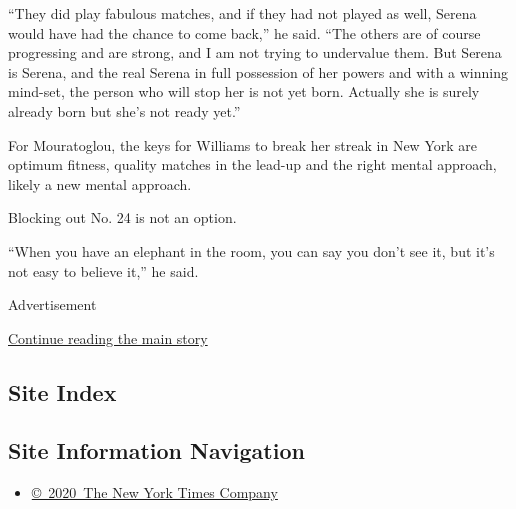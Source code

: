 ``They did play fabulous matches, and if they had not played as well,
Serena would have had the chance to come back,'' he said. ``The others
are of course progressing and are strong, and I am not trying to
undervalue them. But Serena is Serena, and the real Serena in full
possession of her powers and with a winning mind-set, the person who
will stop her is not yet born. Actually she is surely already born but
she's not ready yet.''

For Mouratoglou, the keys for Williams to break her streak in New York
are optimum fitness, quality matches in the lead-up and the right mental
approach, likely a new mental approach.

Blocking out No. 24 is not an option.

``When you have an elephant in the room, you can say you don't see it,
but it's not easy to believe it,'' he said.

Advertisement

\protect\hyperlink{after-bottom}{Continue reading the main story}

\hypertarget{site-index}{%
\subsection{Site Index}\label{site-index}}

\hypertarget{site-information-navigation}{%
\subsection{Site Information
Navigation}\label{site-information-navigation}}

\begin{itemize}
\tightlist
\item
  \href{https://help.nytimes.com/hc/en-us/articles/115014792127-Copyright-notice}{©~2020~The
  New York Times Company}
\end{itemize}

